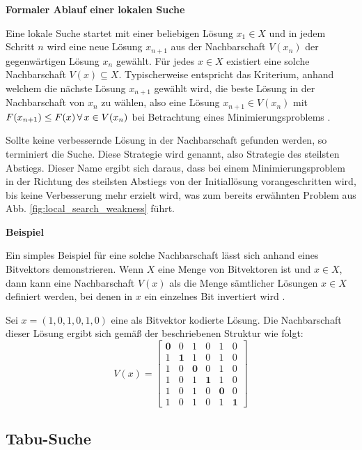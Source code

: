 \textbf{Formaler Ablauf einer lokalen Suche}

Eine lokale Suche startet mit einer beliebigen Lösung $x_1 \in X$ und in jedem Schritt $n$
wird eine neue Lösung $x_{n+1}$ aus der Nachbarschaft $V(x_n)$ der gegenwärtigen Lösung $x_n$ gewählt.
Für jedes $x \in X$ existiert eine solche Nachbarschaft $V(x) \subseteq X$.
Typischerweise entspricht das Kriterium, anhand welchem die nächste Lösung $x_{n+1}$ gewählt wird,
die beste Lösung in der Nachbarschaft von $x_n$ zu wählen, also eine Lösung $x_{n+1} \in V(x_n)$
mit $F(x_{n+1}) \leq F(x) \thinspace \forall \thinspace x \in V(x_n)$ bei Betrachtung eines
Minimierungsproblems \cite{Pirlot1996}.

Sollte keine verbessernde Lösung in der Nachbarschaft gefunden werden, so terminiert die Suche.
Diese Strategie wird  genannt, also Strategie des steilsten Abstiegs.
Dieser Name ergibt sich daraus, dass bei einem Minimierungsproblem in der Richtung des steilsten Abstiegs
von der Initiallösung vorangeschritten wird, bis keine Verbesserung mehr erzielt wird,
was zum bereits erwähnten Problem aus Abb. \ref{fig:local_search_weakness} führt.

\textbf{Beispiel}

Ein simples Beispiel für eine solche Nachbarschaft lässt sich anhand eines Bitvektors demonstrieren.
Wenn $X$ eine Menge von Bitvektoren ist und $x \in X$, dann kann eine Nachbarschaft $V(x)$ als die Menge
sämtlicher Lösungen $x \in X$ definiert werden, bei denen in $x$ ein einzelnes Bit invertiert wird \cite{Pirlot1996}.

Sei $x = (1, 0, 1, 0, 1, 0)$ eine als Bitvektor kodierte Lösung.
Die Nachbarschaft dieser Lösung ergibt sich gemäß der beschriebenen Struktur wie folgt:
\[
V(x) =
  \begin{bmatrix}
    \boldsymbol{0} & 0 & 1 & 0 & 1 & 0 \\
    1 & \boldsymbol{1} & 1 & 0 & 1 & 0 \\
    1 & 0 & \boldsymbol{0} & 0 & 1 & 0 \\
    1 & 0 & 1 & \boldsymbol{1} & 1 & 0 \\
    1 & 0 & 1 & 0 & \boldsymbol{0} & 0 \\
    1 & 0 & 1 & 0 & 1 & \boldsymbol{1}
  \end{bmatrix}
\]

\pagebreak

\subsection{Tabu-Suche}
\label{sec:tabu_search}

